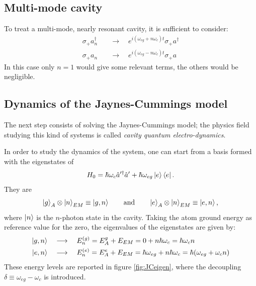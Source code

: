 \subsection{Multi-mode cavity}

To treat a multi-mode, nearly resonant cavity, it is sufficient to consider: 
\begin{align*}
    \sigma_{+} a_n^{\dagger} \quad & \longrightarrow \quad  e^{i(\omega_{eg} + n \omega_c) t} \sigma_{+} a^{\dagger} \\
    \sigma_{+} a_n \quad & \longrightarrow \quad e^{i(\omega_{eg} - n \omega_c) t} \sigma_{+} a
\end{align*}
In this case only $n=1$ would give some relevant terms, the others would be negligible.


\subsection{Dynamics of the Jaynes-Cummings model}

The next step consists of solving the Jaynes-Cummings model; the physics field studying this kind of systems is called \textit{cavity quantum electro-dynamics}.

In order to study the dynamics of the system, one can start from a basis formed with the eigenstates of 
\begin{equation*}
    H_0 = \hbar \omega_c \hat{a}'^\dagger \hat{a}' + \hbar \omega_{eg} \ket{e}\bra{e}. 
\end{equation*}
They are
\begin{align*}
        \ket{g}_A \otimes \ket{n}_{EM} \equiv \ket{g, n} \qquad \text{and} \qquad \ket{e}_A \otimes \ket{n}_{EM} \equiv \ket{e, n}, 
\end{align*}
where $\ket{n}$ is the $n$-photon state in the cavity. 
Taking the atom ground energy as reference value for the zero, the eigenvalues of the eigenstates are given by: 
\begin{align*}
    \ket{g, n} \quad & \longrightarrow \quad E_n^{(g)} = E_A^g + E_{EM}  = 0 + n \hbar \omega_c = \hbar \omega_c n \\
    \ket{e, n} \quad & \longrightarrow \quad E_n^{(e)} = E_A^e + E_{EM}  = \hbar \omega_{eg} + n \hbar \omega_c = \hbar (\omega_{eg}  + \omega_c n )
\end{align*}
These energy levels are reported in figure \ref{fig:JCeigen}, where the decoupling $\delta \equiv \omega_{eg} - \omega_c$ is introduced. 

